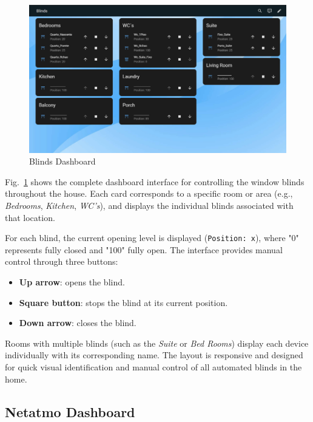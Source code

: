 \documentclass[graybox]{svmult}
\begin{document}
\begin{figure}[H] 
	\centering
	\includegraphics[width=\textwidth]{blinds.png}
	\caption{Blinds Dashboard}
	\label{fig:blinds}
\end{figure}

Fig.~\ref{fig:blinds} shows the complete dashboard interface for controlling the window blinds throughout the house. Each card corresponds to a specific room or area (e.g., \textit{Bedrooms}, \textit{Kitchen}, \textit{WC's}), and displays the individual blinds associated with that location.

For each blind, the current opening level is displayed (\texttt{Position: x}), where "0" represents fully closed and "100" fully open. The interface provides manual control through three buttons:

\begin{itemize}
    \item \textbf{Up arrow}: opens the blind.
    \item \textbf{Square button}: stops the blind at its current position.
    \item \textbf{Down arrow}: closes the blind.
\end{itemize}

Rooms with multiple blinds (such as the \textit{Suite} or \textit{Bed Rooms}) display each device individually with its corresponding name. The layout is responsive and designed for quick visual identification and manual control of all automated blinds in the home.

\subsection{Netatmo Dashboard}
\end{document}
